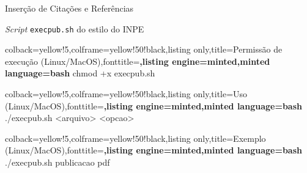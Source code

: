 \documentclass[10pt]{beamer}
\begin{document}
\begin{frame}[fragile]{Inserção de Citações e Referências}
    \begin{block}{\textit{Script} {\tt execpub.sh} do estilo do INPE}
        \vspace{1em}
        \begin{tcblisting}{colback=yellow!5,colframe=yellow!50!black,listing only,title=Permissão de execução (Linux/MacOS),fonttitle=\small\bfseries,listing engine=minted,minted language=bash}
            chmod +x execpub.sh
        \end{tcblisting}
        
        \begin{tcblisting}{colback=yellow!5,colframe=yellow!50!black,listing only,title=Uso (Linux/MacOS),fonttitle=\small\bfseries,listing engine=minted,minted language=bash}
            ./execpub.sh <arquivo> <opcao>
        \end{tcblisting}    
        
        \begin{tcblisting}{colback=yellow!5,colframe=yellow!50!black,listing only,title=Exemplo (Linux/MacOS),fonttitle=\small\bfseries,listing engine=minted,minted language=bash}
            ./execpub.sh publicacao pdf
        \end{tcblisting}        
    \end{block}
\end{frame}

\end{document}
